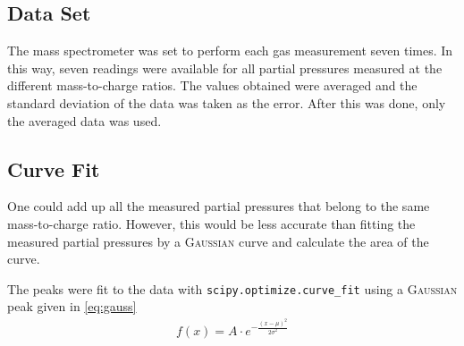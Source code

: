 \subsection{Data Set}
The mass spectrometer was set to perform each gas measurement seven times. In this way, seven readings were available for all partial pressures measured at the different mass-to-charge ratios. The values obtained were averaged and the standard deviation of the data was taken as the error. After this was done, only the averaged data was used. 

\subsection{Curve Fit}
\label{sec:fit}
One could add up all the measured partial pressures that belong to the same mass-to-charge ratio. However, this would be less accurate than fitting the measured partial pressures by a {\scshape Gaussian} curve and calculate the area of the curve. 

The peaks were fit to the data with \texttt{scipy.optimize.curve\_fit}\cite{scipy} using a {\scshape Gaussian} peak given in \eqref{eq:gauss}
\begin{align}
    f(x) = A\cdot e^{-\frac{(x-\mu)^2}{2\sigma^2}} \label{eq:gauss}
\end{align}

